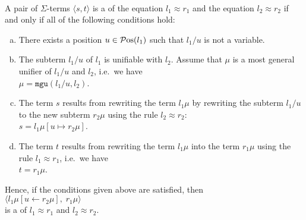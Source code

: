 \begin{Definition} \hspace*{\fill} \\
  A pair of $\Sigma$-terms $\langle s, t\rangle$ is a  of the equation $l_1 \approx r_1$ and
  the equation $l_2 \approx r_2$ if and only if all of the following conditions hold:
  \begin{enumerate}[(a)]
  \item There exists a position $u \in \mathcal{P}\mathrm{os}(l_1)$ such that $l_1/u$ is not a variable.
  \item The subterm $l_1/u$ of $l_1$ is unifiable with $l_2$.  Assume that $\mu$ is a most general unifier
        of $l_1/u$ and $l_2$, i.e.~we have
        \\[0.2cm]
        \hspace*{1.3cm}
        $\mu = \texttt{mgu}(l_1/u, l_2)$.
  \item The term $s$ results from rewriting the term $l_1\mu$ by rewriting the subterm $l_1/u$
        to the new subterm $r_2\mu$ using the rule $l_2 \approx r_2$:      
        \\[0.2cm]
        \hspace*{1.3cm}
        $s = l_1\mu[u \mapsto r_2\mu]$.
  \item The term $t$ results from rewriting the term $l_1\mu$ into the term $r_1\mu$ using the rule
        $l_1 \approx r_1$, i.e.~we have
        \\[0.2cm]
        \hspace*{1.3cm}
        $t = r_1\mu$.  
      \end{enumerate}
      Hence, if the conditions given above are satisfied, then
      \\[0.2cm]
      \hspace*{1.3cm}
      $\bigl\langle l_1\mu[u \leftarrow r_2\mu],\; r_1\mu \bigr\rangle$
      \\[0.2cm]
      is a  of $l_1 \approx r_1$ and $l_2 \approx r_2$. \eod
\end{Definition}

